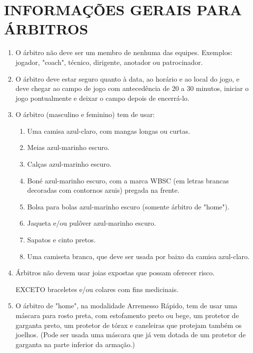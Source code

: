\section{INFORMAÇÕES GERAIS PARA ÁRBITROS }
\begin{multicols}{2}  
	\begin{enumerate}[label=\alph*)]
		\item O árbitro não deve ser um membro de nenhuma das equipes. Exemplos: jogador, 
		"coach", técnico, dirigente, anotador ou patrocinador. 
		
		\item  O árbitro deve estar seguro quanto à data, ao horário e ao local do jogo, e deve 
		chegar ao campo de jogo com antecedência de 20 a 30 minutos, iniciar o jogo 
		pontualmente e deixar o campo depois de encerrá-lo. 
		
		\item  O árbitro (masculino e feminino) tem de usar: 
		\begin{enumerate}[label= \arabic*)]
			\item  Uma camisa azul-claro, com mangas longas ou curtas. 
			\item  Meias azul-marinho escuro. 
			\item  Calças azul-marinho escuro. 
			\item  Boné azul-marinho escuro, com a marca WBSC (em letras brancas decoradas com 
			contornos azuis) pregada na frente. 
			\item  Bolsa para bolas azul-marinho escuro (somente árbitro de "home"). 
			\item  Jaqueta e/ou pulôver azul-marinho escuro. 
			\item  Sapatos e cinto pretos. 
			\item  Uma camiseta branca, que deve ser usada por baixo da camisa azul-claro. 
		\end{enumerate}
		
		
		\item  Árbitros não devem usar joias expostas que possam oferecer risco. 
		
		EXCETO braceletes e/ou colares com fins medicinais. 
		
		\item  O árbitro de "home", na modalidade Arremesso Rápido, tem de usar uma máscara para rosto preta, com estofamento preto ou bege, um protetor de garganta preto, um protetor de tórax e caneleiras que protejam também os joelhos. (Pode ser usada uma máscara que já vem dotada de um protetor de garganta na parte inferior da armação.) 
		

\end{enumerate}
\end{multicols}
